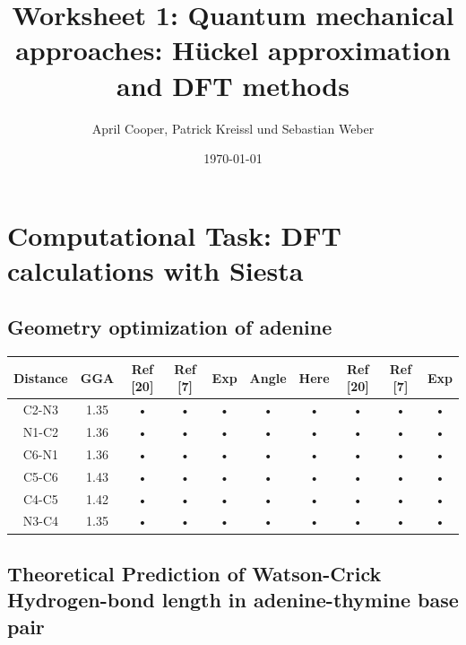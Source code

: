 \documentclass[12pt,a4paper]{scrartcl}
\author{April Cooper, Patrick Kreissl und Sebastian Weber}
\title{Worksheet 1: Quantum mechanical approaches:
Hückel approximation and DFT methods}
\date{\today}
\begin{document}
\maketitle
\tableofcontents
\newpage

\section{Computational Task: DFT calculations with Siesta}

\subsection{Geometry optimization of adenine}

\begin{tabular}{|c|c|c|c|c|c|c|c|c|c|}
\hline 
Distance & GGA & Ref [20] & Ref [7] & Exp & Angle & Here & Ref [20] & Ref [7] & Exp \\ 
\hline 
C2-N3 & 1.35 & • & • & • & • & • & • & • & • \\ 
\hline 
N1-C2 & 1.36 & • & • & • & • & • & • & • & • \\ 
\hline 
C6-N1 & 1.36 & • & • & • & • & • & • & • & • \\ 
\hline 
C5-C6 & 1.43 & • & • & • & • & • & • & • & • \\ 
\hline 
C4-C5 & 1.42 & • & • & • & • & • & • & • & • \\ 
\hline 
N3-C4 & 1.35 & • & • & • & • & • & • & • & • \\ 
\hline 
\end{tabular} 

\newpage

\subsection{Theoretical Prediction of Watson-Crick Hydrogen-bond length in
adenine-thymine base pair}
\end{document}
